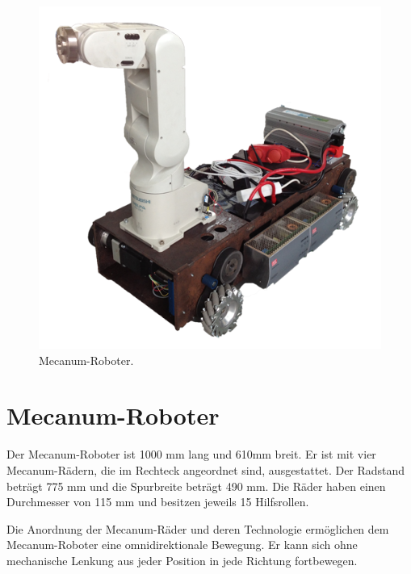 \newpage
\begin{figure}[H]
\centering
 \includegraphics[width=.6\textwidth]{Abbildungen/Roboter} 
\caption[Mecanum-Roboter]{Mecanum-Roboter.}
\label{fig:Roboter}
\end{figure}

\section {Mecanum-Roboter}
\label{sec:Mecanum-Roboter}

Der Mecanum-Roboter ist 1000 mm lang und 610mm breit. Er ist mit vier Mecanum-Rädern, die im Rechteck angeordnet sind, ausgestattet. Der Radstand beträgt 775 mm und die Spurbreite beträgt 490 mm. Die Räder haben einen Durchmesser von 115 mm und besitzen jeweils 15 Hilfsrollen.

Die Anordnung der Mecanum-Räder und deren Technologie ermöglichen dem Mecanum-Roboter eine omnidirektionale Bewegung. Er kann sich ohne mechanische Lenkung aus jeder Position in jede Richtung fortbewegen.

